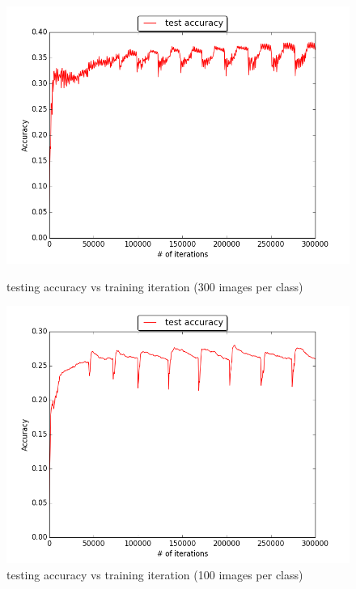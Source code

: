 \documentclass{article} %
\begin{document}
\begin{figure}[H]
    \begin{minipage}{0.5\linewidth}
        \centering
        \includegraphics[scale=0.35]{netmean_per300.png}
        \caption{testing accuracy vs training iteration (300 images per class)}
    \end{minipage}
    \begin{minipage}{0.5\linewidth}
        \centering
        \includegraphics[scale=0.35]{netmean_per100.png}
        \caption{testing accuracy vs training iteration (100 images per class)}
    \end{minipage}
\end{figure}
\end{document}
